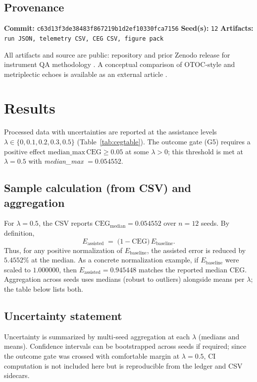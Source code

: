 \documentclass{article}
\newcommand{\provenance}[3]{\textbf{Commit:} \texttt{#1}\quad
  \textbf{Seed(s):} \texttt{#2}\quad
  \textbf{Artifacts:} \texttt{#3}}
\begin{document}
\subsection*{Provenance}
\provenance{c63d13f3de38483f867219b1d2ef10330fca7156}{12}{run JSON, telemetry CSV, CEG CSV, figure pack}

All artifacts and source are public: repository \citep{PrometheusVDMRepo2025} and prior Zenodo release for instrument QA methodology \citep{ZenodoLogisticFirstIntegral2025}. A conceptual comparison of OTOC‑style and metriplectic echoes is available as an external article \citep{Lietz2025EchoesOfMindArticle}.

\section{Results}
Processed data with uncertainties are reported at the assistance levels $\lambda \in \{0, 0.1, 0.2, 0.3, 0.5\}$ (Table~\ref{tab:cegtable}). The outcome gate (G5) requires a positive effect $\mathrm{median\_max\,CEG} \ge 0.05$ at some $\lambda>0$; this threshold is met at $\lambda=0.5$ with \emph{median\_max} $=0.054552$.

\subsection*{Sample calculation (from CSV) and aggregation}
For $\lambda=0.5$, the CSV reports $\mathrm{CEG}_{\mathrm{median}}=0.054552$ over $n=12$ seeds. By definition,
\[
  E_{\mathrm{assisted}} \;=\; \bigl(1-\mathrm{CEG}\bigr)\,E_{\mathrm{baseline}}.
\]
Thus, for any positive normalization of $E_{\mathrm{baseline}}$, the assisted error is reduced by $5.4552\%$ at the median. As a concrete normalization example, if $E_{\mathrm{baseline}}$ were scaled to $1.000000$, then $E_{\mathrm{assisted}}=0.945448$ matches the reported median CEG. Aggregation across seeds uses medians (robust to outliers) alongside means per $\lambda$; the table below lists both.

\subsection*{Uncertainty statement}
Uncertainty is summarized by multi‑seed aggregation at each $\lambda$ (medians and means). Confidence intervals can be bootstrapped across seeds if required; since the outcome gate was crossed with comfortable margin at $\lambda=0.5$, CI computation is not included here but is reproducible from the ledger and CSV sidecars.
\end{document}
